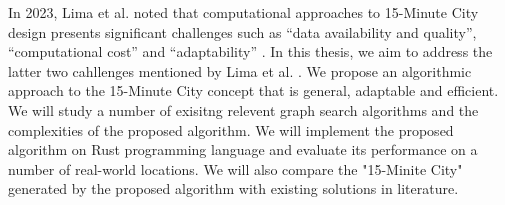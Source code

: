In 2023, Lima et al. noted that computational approaches to 15-Minute City design presents significant challenges such as “data availability and quality”, “computational cost” and “adaptability” \cite{lima_quest_2023}. In this thesis, we aim to address the latter two cahllenges mentioned by Lima et al. \cite{lima_quest_2023}. We propose an algorithmic approach to the 15-Minute City concept that is general, adaptable and efficient. We will study a number of exisitng relevent graph search algorithms and the complexities of the proposed algorithm. We will implement the proposed algorithm on Rust programming language and evaluate its performance on a number of real-world locations. We will also compare the "15-Minite City" generated by the proposed algorithm with existing solutions in literature.